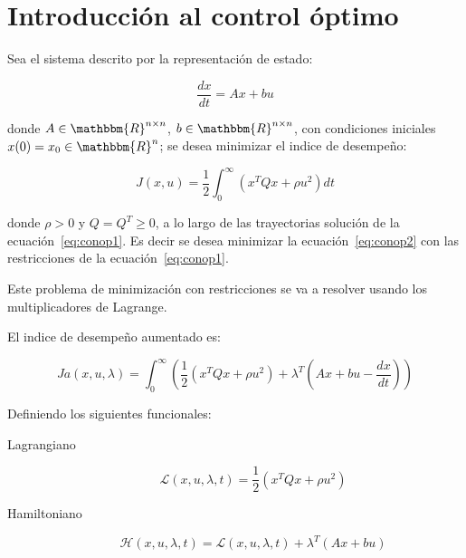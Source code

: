 \chapter{Introducción al control óptimo}

    Sea el sistema descrito por la representación de estado:

    \begin{equation} \label{eq:conop1}
        \frac{dx}{dt} = A x + b u
    \end{equation}

    donde $A \in \mathbbm{R}^{n \times n}$, $b \in \mathbbm{R}^{n \times n}$, con condiciones iniciales $x(0) = x_0 \in \mathbbm{R}^n$; se desea minimizar el indice de desempeño:

    \begin{equation} \label{eq:conop2}
        J(x, u) = \frac{1}{2} \int_0^{\infty} \left( x^T Q x + \rho u^2 \right) dt
    \end{equation}

    donde $\rho > 0$ y $Q = Q^T \ge 0$, a lo largo de las trayectorias solución de la ecuación~\ref{eq:conop1}. Es decir se desea minimizar la ecuación~\ref{eq:conop2} con las restricciones de la ecuación~\ref{eq:conop1}.

    Este problema de minimización con restricciones se va a resolver usando los multiplicadores de Lagrange.

    El indice de desempeño aumentado es:

    \begin{equation*}
        Ja(x, u, \lambda) = \int_0^{\infty} \left( \frac{1}{2}  \left( x^T Q x + \rho u^2 \right) + \lambda^T \left( Ax + bu - \frac{dx}{dt} \right) \right)
    \end{equation*}

    Definiendo los siguientes funcionales:

    \begin{description}
        \item [Lagrangiano]
        \begin{equation}
            \mathscr{L}(x, u, \lambda, t) = \frac{1}{2} \left( x^T Q x + \rho u^2 \right)
        \end{equation}
        \item [Hamiltoniano]
        \begin{equation}
            \mathscr{H}(x, u, \lambda, t) = \mathscr{L}(x, u, \lambda, t) + \lambda^T (A x + b u)
        \end{equation}
    \end{description}

